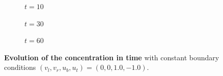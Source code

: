 \begin{figure}
\begin{subfigure}[t]{.22\textwidth}
    	\caption{$t=10$}
	\label{fig:mixing_example_10}
\end{subfigure} \quad
\begin{subfigure}[t]{.22\textwidth}
	\centering
    	\caption{$t=30$}
	\label{fig:mixing_example_30}
\end{subfigure} \quad
\begin{subfigure}[t]{.22\textwidth}
	\centering
    	\caption{$t=60$}
	\label{fig:mixing_example_60}
\end{subfigure}

\caption{\textbf{Evolution of the concentration in time} with constant boundary conditions $(v_l, v_r, u_b, u_t) = (0, 0, 1.0, -1.0)$.}
\label{fig:mixing_example}
\end{figure} 
